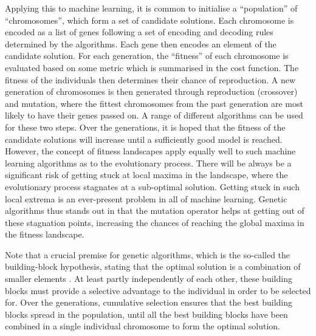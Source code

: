 \documentclass[multicolumn, 10pt]{extarticle}
\begin{document}
Applying this to machine learning, it is common to initialise a ``population'' of ``chromosomes'', which form a set of candidate solutions. Each chromosome is encoded as a list of genes following a set of encoding and decoding rules determined by the algorithms. Each gene then encodes an element of the candidate solution. For each generation, the ``fitness'' of each chromosome is evaluated based on some metric which is summarised in the cost function. The fitness of the individuals then determines their chance of reproduction.
A new generation of chromosomes is then generated through reproduction (crossover) and mutation, where the fittest chromosomes from the past generation are most likely to have their genes passed on. A range of different algorithms can be used for these two steps. Over the generations, it is hoped that the fitness of the candidate solutions will increase until a sufficiently good model is reached. However, the concept of fitness landscapes apply equally well to such machine learning algorithms as to the evolutionary process. There will be always be a significant risk of getting stuck at local maxima in the landscape, where the evolutionary process stagnates at a sub-optimal solution. Getting stuck in such local extrema is an ever-present problem in all of machine learning. Genetic algorithms thus stands out in that the mutation operator helps at getting out of these stagnation points, increasing the chances of reaching the global maxima in the fitness landscape.

Note that a crucial premise for genetic algorithms, which is the so-called the building-block hypothesis, stating that the optimal solution is a combination of smaller elements \cite{Eyal}. At least partly independently of each other, these building blocks must provide a selective advantage to the individual in order to be selected for. Over the generations, cumulative selection ensures that the best building blocks spread in the population, until all the best building blocks have been combined in a single individual chromosome to form the optimal solution.
\end{document}
